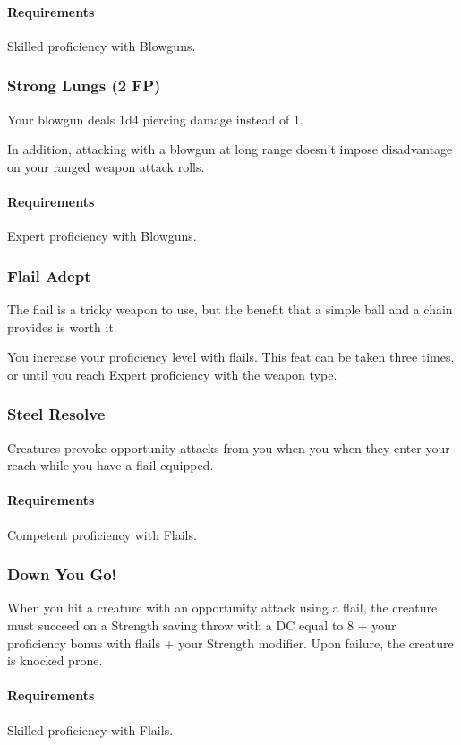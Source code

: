     \paragraph{Requirements} Skilled proficiency with Blowguns.
\subsubsection{Strong Lungs (2 FP)} \label{feat::stronglungs}
    Your blowgun deals 1d4 piercing damage instead of 1.

    In addition, attacking with a blowgun at long range doesn't impose disadvantage on your ranged weapon attack rolls.
    \paragraph{Requirements} Expert proficiency with Blowguns.
\subsubsection{Flail Adept} \label{feat::flailadept}
    The flail is a tricky weapon to use, but the benefit that a simple ball and a chain provides is worth it.

    You increase your proficiency level with flails.
    This feat can be taken three times, or until you reach Expert proficiency with the weapon type.
\subsubsection{Steel Resolve} \label{feat::steelresolve}
    Creatures provoke opportunity attacks from you when you when they enter your reach while you have a flail equipped.
    \paragraph{Requirements} Competent proficiency with Flails.
\subsubsection{Down You Go!} \label{feat::downyougo}
    When you hit a creature with an opportunity attack using a flail, the creature must succeed on a Strength saving throw with a DC equal to 8 + your proficiency bonus with flails + your Strength modifier.
    Upon failure, the creature is knocked prone.
    \paragraph{Requirements} Skilled proficiency with Flails.
